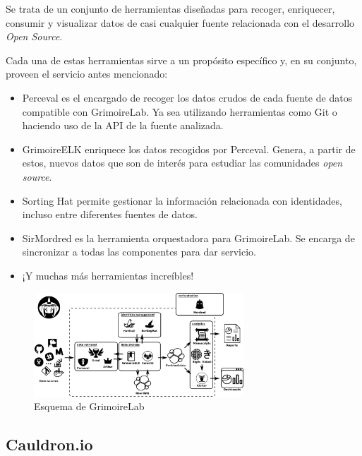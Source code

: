 Se trata de un conjunto de herramientas diseñadas para recoger, enriquecer, consumir y visualizar datos de casi cualquier fuente relacionada con el desarrollo \emph{Open Source}.

Cada una de estas herramientas sirve a un propósito específico y, en su conjunto, proveen el servicio antes mencionado:

\begin{itemize}
    \item Perceval es el encargado de recoger los datos crudos de cada fuente de datos compatible con GrimoireLab. Ya sea utilizando herramientas como Git o haciendo uso de la API de la fuente analizada.
    \item GrimoireELK enriquece los datos recogidos por Perceval. Genera, a partir de estos, nuevos datos que son de interés para estudiar las comunidades \emph{open source}.
    \item Sorting Hat permite gestionar la información relacionada con identidades, incluso entre diferentes fuentes de datos.
    \item SirMordred es la herramienta orquestadora para GrimoireLab. Se encarga de sincronizar a todas las componentes para dar servicio.
    \item ¡Y muchas más herramientas increíbles!
\end{itemize}

\begin{figure}[ht]
    \centering
    \includegraphics[width=0.7\textwidth]{Figures/grimoirelab-schema}
    \decoRule
    \caption[GrimoireLab (Esquema)]{Esquema de GrimoireLab \emph{\parencite{Reference12}}}
    \label{fig:grimoirelab-schema}
\end{figure}

\subsection{Cauldron.io}\label{sec:cauldron}

